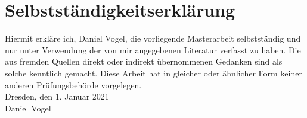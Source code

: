 \chapter*{Selbstständigkeitserklärung}

Hiermit erkläre ich, Daniel Vogel, die vorliegende Masterarbeit selbstständig und nur unter Verwendung der von mir angegebenen Literatur verfasst zu haben. Die aus fremden Quellen direkt oder indirekt übernommenen Gedanken sind als solche kenntlich gemacht. Diese Arbeit hat in gleicher oder ähnlicher Form keiner anderen Prüfungsbehörde vorgelegen.\\[3em]

Dresden, den 1. Januar 2021\\[5em]

Daniel Vogel
